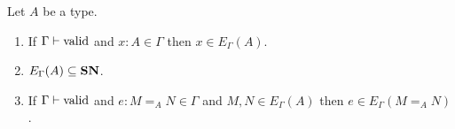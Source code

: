 \begin{lemma}
\label{lm:varcompute2}
Let $A$ be a type.
\begin{enumerate}
\item
If $\Gamma \vdash \mathrm{valid}$ and $x : A \in \Gamma$ then $x \in E_\Gamma(A)$.

\begin{code}%
\>  \AgdaSymbol{:}  \AgdaSymbol{\{}\AgdaSymbol{\}} \AgdaSymbol{\{} \AgdaSymbol{:}  \AgdaSymbol{\}} \AgdaSymbol{\{} \AgdaSymbol{:}   \AgdaSymbol{\}}       \AgdaSymbol{(}  \AgdaSymbol{)} \AgdaSymbol{(} \AgdaSymbol{)}\<%
\end{code}
\item
$E_\Gamma(A) \subseteq \mathbf{SN}$.

\begin{code}%
\>  \AgdaSymbol{:}  \AgdaSymbol{\{}\AgdaSymbol{\}} \AgdaSymbol{\{} \AgdaSymbol{:}  \AgdaSymbol{\}} \AgdaSymbol{\{}\AgdaSymbol{\}} \AgdaSymbol{\{} \AgdaSymbol{:}  \AgdaSymbol{\}}    \AgdaSymbol{(} \AgdaSymbol{)}    \<%
\end{code}
\item
If $\Gamma \vdash \mathrm{valid}$ and $e : M =_A N \in \Gamma$ and $M, N \in E_\Gamma(A)$ then $e \in E_\Gamma(M =_A N)$.


\end{enumerate}
\end{lemma}
